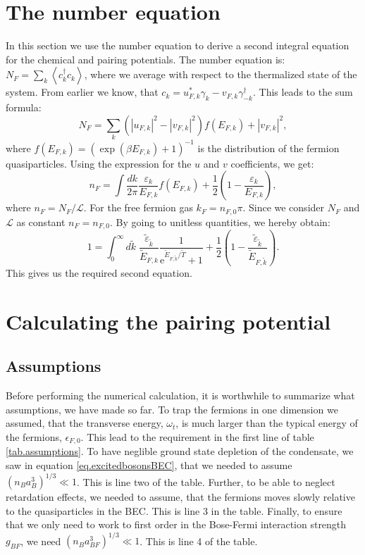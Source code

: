 \section{The number equation} \label{sec.chemicalpotential.numberequation}
In this section we use the number equation to derive a second integral equation for the chemical and pairing potentials. The number equation is: $N_F = \sum_k \left \langle c_k^\dagger c_k \right \rangle$, where we average with respect to the thermalized state of the system. From earlier we know, that $c_k = u_{F,k}^* \gamma_k -v_{F,k} \gamma_{-k}^\dagger$. This leads to the sum formula:
\begin{equation}
N_F = \sum_k \left(|u_{F,k}|^2-|v_{F,k}|^2\right) f(E_{F,k}) + |v_{F,k}|^2,\nonumber
\end{equation}
where $f(E_{F,k}) = (\exp(\beta E_{F,k}) + 1)^{-1}$ is the distribution of the fermion quasiparticles. Using the expression for the $u$ and $v$ coefficients, we get:
\begin{equation}
n_F = \int \frac{dk}{2\pi} \frac{\varepsilon_k}{E_{F,k}}f(E_{F,k}) + \frac{1}{2}\left(1 - \frac{\varepsilon_k}{E_{F,k}}\right), \nonumber
\end{equation}
where $n_F = N_F/\mathcal{L}$. For the free fermion gas $k_F = n_{F,0}\pi$. Since we consider $N_F$ and $\mathcal{L}$ as constant $n_F = n_{F,0}$. By going to unitless quantities, we hereby obtain:
\begin{equation}
1 = \int_0^\infty d\tilde{k} \; \frac{\tilde{\varepsilon}_{\tilde{k}}}{\tilde{E}_{F,k}}\frac{1}{\text{e}^{ \tilde{E}_{F,\tilde{k}}/\tilde{T} } + 1 } + \frac{1}{2}\left(1 - \frac{\tilde{\varepsilon}_{\tilde{k}}}{\tilde{E}_{F,\tilde{k}}}\right). 
\label{eq.NumberEquationUnitless}
\end{equation}
This gives us the required second equation.


\section{Calculating the pairing potential} \label{sec.pairingandchemicalpotential.numericalcalculation}
\subsection{Assumptions}
Before performing the numerical calculation, it is worthwhile to summarize what assumptions, we have made so far. To trap the fermions in one dimension we assumed, that the transverse energy, $\omega_t$, is much larger than the typical energy of the fermions, $\epsilon_{F,0}$. This lead to the requirement in the first line of table \ref{tab.assumptions}. To have neglible ground state depletion of the condensate, we saw in equation \eqref{eq.excitedbosonsBEC}, that we needed to assume $(n_Ba_B^3)^{1/3}\ll 1$. This is line two of the table. Further, to be able to neglect retardation effects, we needed to assume, that the fermions moves slowly relative to the quasiparticles in the BEC. This is line 3 in the table. Finally, to ensure that we only need to work to first order in the Bose-Fermi interaction strength $g_{BF}$, we need $(n_Ba_{BF}^3)^{1/3} \ll 1$. This is line 4 of the table. 

